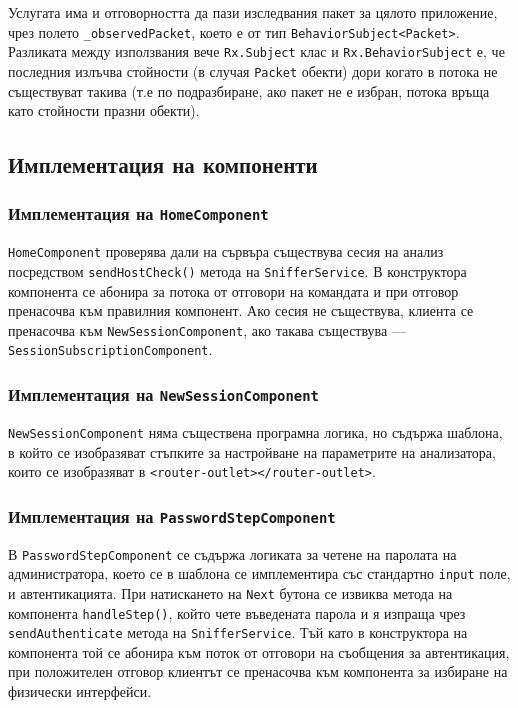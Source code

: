 \documentclass[12pt,a4paper,oneside]{book}
\begin{document}
Услугата има и отговорността да пази изследвания пакет за цялото приложение,
чрез полето
\texttt{\_observedPacket}, което е от тип \texttt{BehaviorSubject<Packet>}.
Разликата между използвания вече \texttt{Rx.Subject} клас и
\texttt{Rx.BehaviorSubject} е, че последния излъчва стойности
(в случая \texttt{Packet} обекти) дори
когато в потока не съществуват такива (т.е по подразбиране, ако пакет не е
избран,
потока връща като стойности празни обекти).

\subsection{Имплементация на компоненти}

\subsubsection{Имплементация на \texttt{HomeComponent}}

\texttt{HomeComponent} проверява дали на сървъра съществува сесия на анализ
посредством \texttt{sendHostCheck()} метода на \texttt{SnifferService}. В
конструктора компонента се абонира за потока от отговори на командата и при
отговор пренасочва към правилния компонент. Ако сесия не съществува,
клиента се пренасочва към \texttt{NewSessionComponent}, ако такава
съществува --- \texttt{SessionSubscriptionComponent}.

\subsubsection{Имплементация на \texttt{NewSessionComponent}}

\texttt{NewSessionComponent} няма съществена програмна логика, но съдържа
шаблона, в който се изобразяват стъпките за настройване на параметрите на
анализатора, които се изобразяват в \texttt{<router-outlet></router-outlet>}.

\subsubsection{Имплементация на \texttt{PasswordStepComponent}}

В \texttt{PasswordStepComponent} се съдържа логиката за четене на
паролата на администратора, което се в шаблона се имплементира със
стандартно \texttt{input} поле, и автентикацията. При натискането на
\texttt{Next} бутона се извиква метода на компонента \texttt{handleStep()},
който чете въведената парола и я изпраща
чрез \texttt{sendAuthenticate} метода на
\texttt{SnifferService}. Тъй като в конструктора на компонента той се
абонира към поток от отговори на съобщения за автентикация, при положителен
отговор клиентът се пренасочва към компонента за избиране на физически
интерфейси.
\end{document}
